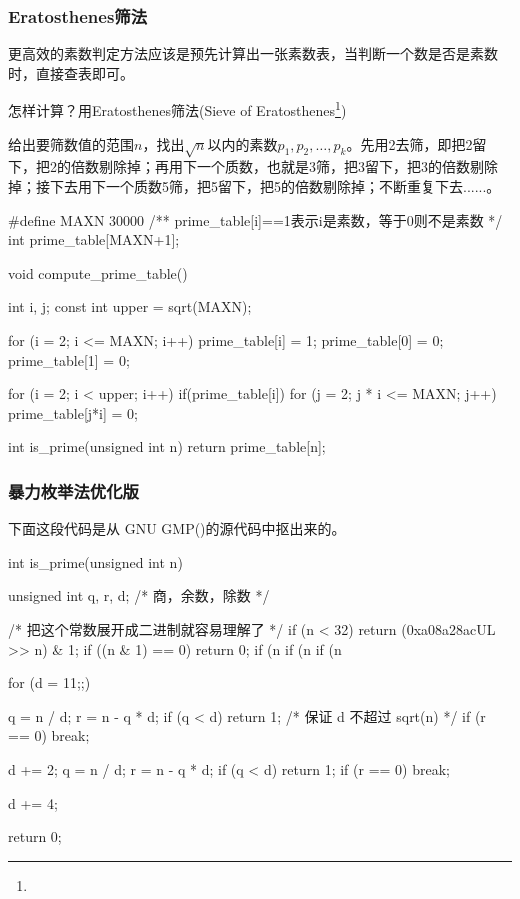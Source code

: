 \subsubsection{Eratosthenes筛法}
更高效的素数判定方法应该是预先计算出一张素数表，当判断一个数是否是素数时，直接查表即可。

怎样计算？用Eratosthenes筛法(Sieve of Eratosthenes\footnote{})

给出要筛数值的范围$n$，找出$\sqrt{n}$以内的素数$p_{1},p_{2},\dots,p_{k}$。先用2去筛，即把2留下，把2的倍数剔除掉；再用下一个质数，也就是3筛，把3留下，把3的倍数剔除掉；接下去用下一个质数5筛，把5留下，把5的倍数剔除掉；不断重复下去......。

\begin{Code}
#define MAXN 30000
/** prime_table[i]==1表示i是素数，等于0则不是素数 */
int prime_table[MAXN+1];

void compute_prime_table() {
    int i, j;
    const int upper = sqrt(MAXN);

    for (i = 2; i <= MAXN; i++) prime_table[i] = 1;
    prime_table[0] = 0;
    prime_table[1] = 0;

    for (i = 2; i < upper; i++) if(prime_table[i]) {
        for (j = 2; j * i <= MAXN; j++) prime_table[j*i] = 0;
    }
}

int is_prime(unsigned int n) {
    return prime_table[n];
}
\end{Code}

\subsubsection{暴力枚举法优化版}
下面这段代码是从 GNU GMP()的源代码中抠出来的。

\begin{Code}
int is_prime(unsigned int n) {
    unsigned int q, r, d;    /* 商，余数，除数 */

    /* 把这个常数展开成二进制就容易理解了 */
    if (n < 32) return (0xa08a28acUL >> n) & 1;
    if ((n & 1) == 0) return 0;
    if (n %
    if (n %
    if (n %

    for (d = 11;;) {
        q = n / d;
        r = n - q * d;
        if (q < d) return 1;    /* 保证 d 不超过 sqrt(n) */
        if (r == 0) break;

        d += 2;
        q = n / d;
        r = n - q * d;
        if (q < d) return 1;
        if (r == 0) break;

        d += 4;
    }
    return 0;
}
\end{Code}


